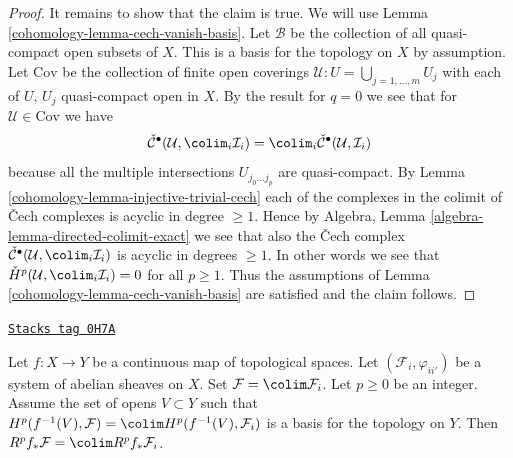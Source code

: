 \begin{proof}
\medskip\noindent
It remains to show that the claim is true. We will use
Lemma \ref{cohomology-lemma-cech-vanish-basis}.
Let $\mathcal{B}$ be the collection of all quasi-compact open
subsets of $X$. This is a basis for the topology on $X$ by assumption.
Let $\text{Cov}$ be the collection of finite open coverings
$\mathcal{U} : U = \bigcup_{j = 1, \ldots, m} U_j$ with each
of $U$, $U_j$ quasi-compact open in $X$. By the result for $q = 0$
we see that for $\mathcal{U} \in \text{Cov}$ we have
$$
\check{\mathcal{C}}^\bullet(\mathcal{U}, \colim_i \mathcal{I}_i)
=
\colim_i \check{\mathcal{C}}^\bullet(\mathcal{U}, \mathcal{I}_i)
$$
because all the multiple intersections $U_{j_0 \ldots j_p}$
are quasi-compact. By Lemma \ref{cohomology-lemma-injective-trivial-cech}
each of the complexes in the colimit of {\v C}ech complexes is
acyclic in degree $\geq 1$. Hence by
Algebra, Lemma \ref{algebra-lemma-directed-colimit-exact}
we see that also the {\v C}ech complex
$\check{\mathcal{C}}^\bullet(\mathcal{U}, \colim_i \mathcal{I}_i)$
is acyclic in degrees $\geq 1$. In other words we see that
$\check{H}^p(\mathcal{U},  \colim_i \mathcal{I}_i) = 0$
for all $p \geq 1$. Thus the assumptions of
Lemma \ref{cohomology-lemma-cech-vanish-basis} are satisfied and the claim follows.
\end{proof}

\begin{lemma}
\label{cohomology-lemma-higher-direct-image-colimit}
\href{https://stacks.math.columbia.edu/tag/0H7A}{\texttt{Stacks tag 0H7A}}

Let $f : X \to Y$ be a continuous map of topological spaces.
Let $(\mathcal{F}_i, \varphi_{ii'})$ be a system of
abelian sheaves on $X$. Set $\mathcal{F} = \colim \mathcal{F}_i$.
Let $p \geq 0$ be an integer. Assume the set of opens $V \subset Y$ such that
$H^p(f^{-1}(V), \mathcal{F}) = \colim H^p(f^{-1}(V), \mathcal{F}_i)$
is a basis for the topology on $Y$. Then
$R^pf_*\mathcal{F} = \colim R^pf_*\mathcal{F}_i$.
\end{lemma}

